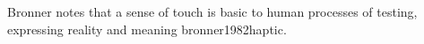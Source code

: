 \documentclass{chi-ext}
\begin{document}
Bronner notes that a sense of touch is basic to human processes of testing, expressing reality and meaning {bronner1982haptic}. 






\end{document}

